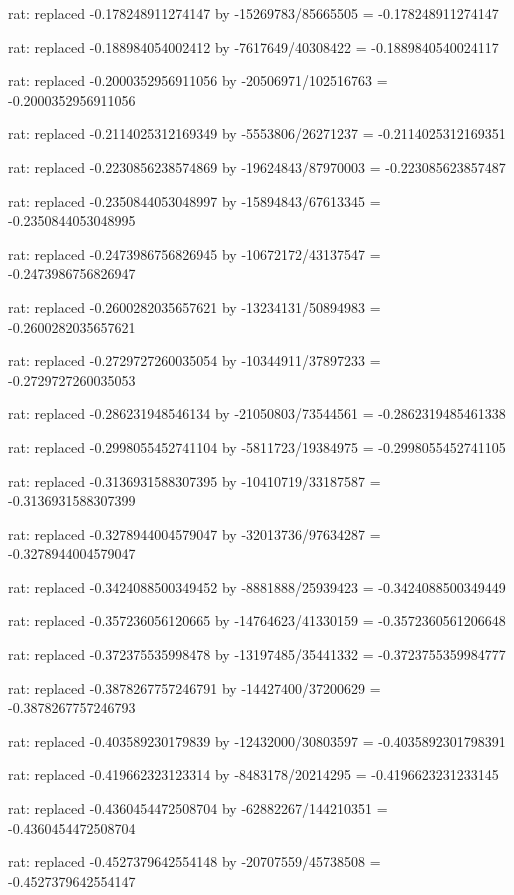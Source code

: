 \documentclass[a4paper,10pt]{article}
\begin{document}
\begin{eulernotebook}
\begin{eulercomment}
\begin{eulercomment}
\begin{eulercomment}
\begin{eulercomment}
\begin{eulercomment}
\begin{eulercomment}
\begin{eulercomment}
\begin{eulercomment}
\begin{eulercomment}
\begin{eulercomment}
\begin{eulercomment}
\begin{eulercomment}
\begin{eulercomment}
\begin{eulercomment}
\begin{eulercomment}
\begin{eulercomment}
\begin{euleroutput}
  rat: replaced -0.178248911274147 by -15269783/85665505 = -0.178248911274147
  
  rat: replaced -0.188984054002412 by -7617649/40308422 = -0.1889840540024117
  
  rat: replaced -0.2000352956911056 by -20506971/102516763 = -0.2000352956911056
  
  rat: replaced -0.2114025312169349 by -5553806/26271237 = -0.2114025312169351
  
  rat: replaced -0.2230856238574869 by -19624843/87970003 = -0.223085623857487
  
  rat: replaced -0.2350844053048997 by -15894843/67613345 = -0.2350844053048995
  
  rat: replaced -0.2473986756826945 by -10672172/43137547 = -0.2473986756826947
  
  rat: replaced -0.2600282035657621 by -13234131/50894983 = -0.2600282035657621
  
  rat: replaced -0.2729727260035054 by -10344911/37897233 = -0.2729727260035053
  
  rat: replaced -0.286231948546134 by -21050803/73544561 = -0.2862319485461338
  
  rat: replaced -0.2998055452741104 by -5811723/19384975 = -0.2998055452741105
  
  rat: replaced -0.3136931588307395 by -10410719/33187587 = -0.3136931588307399
  
  rat: replaced -0.3278944004579047 by -32013736/97634287 = -0.3278944004579047
  
  rat: replaced -0.3424088500349452 by -8881888/25939423 = -0.3424088500349449
  
  rat: replaced -0.357236056120665 by -14764623/41330159 = -0.3572360561206648
  
  rat: replaced -0.372375535998478 by -13197485/35441332 = -0.3723755359984777
  
  rat: replaced -0.3878267757246791 by -14427400/37200629 = -0.3878267757246793
  
  rat: replaced -0.403589230179839 by -12432000/30803597 = -0.4035892301798391
  
  rat: replaced -0.419662323123314 by -8483178/20214295 = -0.4196623231233145
  
  rat: replaced -0.4360454472508704 by -62882267/144210351 = -0.4360454472508704
  
  rat: replaced -0.4527379642554148 by -20707559/45738508 = -0.4527379642554147
  

\end{euleroutput}
\end{eulercomment}
\end{eulercomment}
\end{eulercomment}
\end{eulercomment}
\end{eulercomment}
\end{eulercomment}
\end{eulercomment}
\end{eulercomment}
\end{eulercomment}
\end{eulercomment}
\end{eulercomment}
\end{eulercomment}
\end{eulercomment}
\end{eulercomment}
\end{eulercomment}
\end{eulercomment}
\end{eulernotebook}
\end{document}
